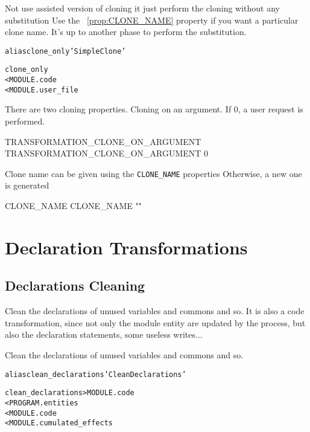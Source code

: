 \documentclass[a4paper]{report}
\newenvironment{PipsMake}{\begin{alltt}}{\end{alltt}}
\newcommand{\PipsPropRef}[1]{\texttt{\detokenize{#1}}~\ref{prop:#1}}
\newenvironment{PipsPass}[1]{\label{pass:#1}}{}
\begin{document}
\begin{PipsPass}{clone_only}
Not use assisted version of cloning
it just perform the cloning without any substitution
Use the \PipsPropRef{CLONE_NAME} property if you want a particular clone name.
It's up to another phase to perform the substitution.
\end{PipsPass}

\begin{PipsMake}

alias clone_only 'Simple Clone'

clone_only
        < MODULE.code
        < MODULE.user_file
\end{PipsMake}

There are two cloning properties.
Cloning on an argument. If 0, a user request is performed.

\begin{PipsProp}{TRANSFORMATION_CLONE_ON_ARGUMENT}
TRANSFORMATION_CLONE_ON_ARGUMENT 0
\end{PipsProp}

Clone name can be given using the \lstinline|CLONE_NAME| properties
Otherwise, a new one is generated
\begin{PipsProp}{CLONE_NAME}
CLONE_NAME ""
\end{PipsProp}



\section{Declaration Transformations}

\subsection{Declarations Cleaning}

Clean the declarations of unused variables and commons and so.
It is also a code transformation, since not only the module entity are
updated by the process, but also the declaration statements, some useless writes...

\begin{PipsPass}{clean_declarations}
Clean the declarations of unused variables and commons and so.
\end{PipsPass}

\begin{PipsMake}
alias clean_declarations 'Clean Declarations'

clean_declarations      > MODULE.code
        < PROGRAM.entities
        < MODULE.code
		< MODULE.cumulated_effects
\end{PipsMake}
\end{document}
